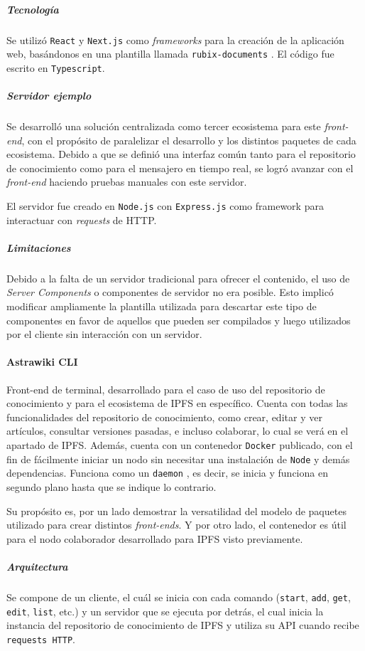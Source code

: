 \subparagraph{Tecnología} Se utilizó \texttt{React} \cite{react} y \texttt{Next.js} \cite{next} como \textit{frameworks} para la creación de la aplicación web, basándonos en una plantilla llamada \texttt{rubix-documents} \cite{rubix}. El código fue escrito en \texttt{Typescript}.

\subparagraph{Servidor ejemplo} Se desarrolló una solución centralizada como tercer ecosistema para este \textit{front-end}, con el propósito de paralelizar el desarrollo y los distintos paquetes de cada ecosistema. Debido a que se definió una interfaz común tanto para el repositorio de conocimiento como para el mensajero en tiempo real, se logró avanzar con el \textit{front-end} haciendo pruebas manuales con este servidor.

El servidor fue creado en \texttt{Node.js} con \texttt{Express.js} como framework para interactuar con \textit{requests} de HTTP.

\subparagraph{Limitaciones} Debido a la falta de un servidor tradicional para ofrecer el contenido, el uso de \textit{Server Components} o componentes de servidor \cite{server-components} no era posible. Esto implicó modificar ampliamente la plantilla utilizada para descartar este tipo de componentes en favor de aquellos que pueden ser compilados y luego utilizados por el cliente sin interacción con un servidor.

\paragraph{Astrawiki CLI}

Front-end de terminal, desarrollado para el caso de uso del repositorio de conocimiento y para el ecosistema de IPFS en específico. Cuenta con todas las funcionalidades del repositorio de conocimiento, como crear, editar y ver artículos, consultar versiones pasadas, e incluso colaborar, lo cual se verá en el apartado de IPFS. Además, cuenta con un contenedor \texttt{Docker} publicado, con el fin de fácilmente iniciar un nodo sin necesitar una instalación de \texttt{Node} y demás dependencias. Funciona como un \texttt{daemon} \cite{daemon}, es decir, se inicia y funciona en segundo plano hasta que se indique lo contrario.

Su propósito es, por un lado demostrar la versatilidad del modelo de paquetes utilizado para crear distintos \textit{front-ends}. Y por otro lado, el contenedor es útil para el nodo colaborador desarrollado para IPFS visto previamente.

\subparagraph{Arquitectura} Se compone de un cliente, el cuál se inicia con cada comando (\texttt{start}, \texttt{add}, \texttt{get}, \texttt{edit}, \texttt{list}, etc.) y un servidor que se ejecuta por detrás, el cual inicia la instancia del repositorio de conocimiento de IPFS y utiliza su API cuando recibe \texttt{requests HTTP}.

